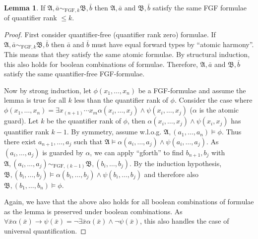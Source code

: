 \documentclass[draft]{scrartcl}
\theoremstyle{definition}
\newtheorem{lemma}[theorem]{Lemma}
\newcommand{\str}[1]{\mathfrak{#1}}
\begin{document}
\begin{lemma}
  If $\str{A}, \bar{a} \sim_{\mathrm{FGF},k} \str{B},\bar{b}$ then $\str{A}, \bar{a}$ and $\str{B}, \bar{b}$ satisfy the same FGF formulae of quantifier rank $\le k$.
\end{lemma}
\begin{proof}
  First consider quantifier-free (quantifier rank zero) formulae.
  If $\str{A}, \bar{a} \sim_{\mathrm{FGF},k} \str{B}, \bar{b}$ then $\bar{a}$ and $\bar{b}$ must have equal forward types by ``atomic harmony''.
  This means that they satisfy the same atomic formulae.
  By structural induction, this also holds for boolean combinations of formulae.
  Therefore, $\str{A}, \bar{a}$ and $\str{B}, \bar{b}$ satisfy the same quantifier-free FGF-formulae.

  Now by strong induction, let $\phi(x_{1}, \ldots, x_{n})$ be a FGF-formulae and assume the lemma is true for all $k$ less than the quantifier rank of $\phi$.
  Consider the case where $\phi(x_{1}, \ldots, x_{n}) = \exists{x_{(n+1)}\cdots{}x_{m}} \alpha(x_{i}, \ldots, x_{j}) \land \psi(x_{i}, \ldots, x_{j})$ ($\alpha$ is the atomic guard).
  Let $k$ be the quantifier rank of $\phi$, then $\alpha(x_{i},\ldots,x_{j}) \land \psi(x_{i}, x_{j})$ has quantifier rank $k - 1$.
  By symmetry, assume w.l.o.g. $\str{A}, (a_{1}, \ldots, a_{n}) \models \phi$.
  Thus there exist $a_{n+1}, \ldots, a_{j}$ such that $\str{A} \models \alpha(a_{i}, \ldots, a_{j}) \land \psi(a_{i}, \ldots, a_{j})$.
  As $(a_{i}, \ldots, a_{j})$ is guarded by $\alpha$, we can apply ``gforth'' to find $b_{n+1}, b_{j}$ with $\str{A}, (a_{i}, \ldots, a_{j}) \sim_{\mathrm{FGF},(k-1)} \str{B}, (b_{i}, \ldots, b_{j})$.
  By the induction hypothesis, $\str{B}, (b_{i}, \ldots, b_{j}) \models \alpha(b_{i}, \ldots, b_{j}) \land \psi(b_{i}, \ldots, b_{j})$ and therefore also $\str{B}, (b_{1}, \ldots, b_{n}) \models \phi$.

  Again, we have that the above also holds for all boolean combinations of formulae as the lemma is preserved under boolean combinations.
  As $\forall{\bar{x}} \alpha(\bar{x}) \rightarrow \psi(\bar{x}) = \neg \exists{\bar{x}} \alpha(\bar{x}) \land \neg \psi(\bar{x})$, this also handles the case of universal quantification.
\end{proof}
\end{document}
